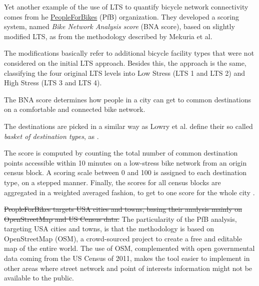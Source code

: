 \documentclass[information,article,submit,moreauthors,pdftex,10pt,a4paper]{mdpi}
\theoremstyle{mdpi}
\newcounter{ex}
\newcounter{re}
\theoremstyle{mdpidefinition}
\begin{document}
\begin{mycolorbox}[colback=yellow]
Yet another example of the use of LTS to quantify bicycle network connectivity comes from he \href{https://peopleforbikes.org/}{PeopleForBikes} (PfB) organization. They developed a scoring system, named \textit{Bike Network Analysis score} (BNA score), based on slightly modified LTS, as from the methodology described by Mekuria et al. 
\end{mycolorbox}
\begin{mycolorbox}[colback=cyan]
The modifications basically refer to additional bicycle facility types that were not considered on the initial LTS approach. Besides this, the approach is the same, classifying the four original LTS levels into Low Stress (LTS 1 and LTS 2) and High Stress (LTS 3 and LTS 4).
\end{mycolorbox}
The BNA score determines how people in a city can get to common destinations on a comfortable and connected bike network. 
\begin{mycolorbox}[colback=yellow]
The destinations are picked in a similar way as Lowry et al. define their so called \textit{basket of destination types}, as  \cite[p.130]{Lowry2016}.
\end{mycolorbox}
The score is computed by counting the total number of common destination points accessible within 10 minutes on a low-stress bike network from an origin census block. A scoring scale between 0 and 100 is assigned to each destination type, on a stepped manner. Finally, the scores for all census blocks are aggregated in a weighted averaged fashion, to get to one score for the whole city \cite{PeopleforBikes2014}.

\begin{mycolorbox}[colback=yellow]
\sout{PeopleForBikes targets USA cities and towns, basing their analysis mainly on OpenStreetMap and US Census data.} The particularity of the PfB analysis, targeting USA cities and towns, is that the methodology is based on OpenStreetMap (OSM), a crowd-sourced project to create a free and editable map of the entire world. The use of OSM, complemented with open governmental data coming from the US Census of 2011, makes the tool easier to implement in other areas where street network and point of interests information might not be available to the public.
\end{mycolorbox}
\end{document}
